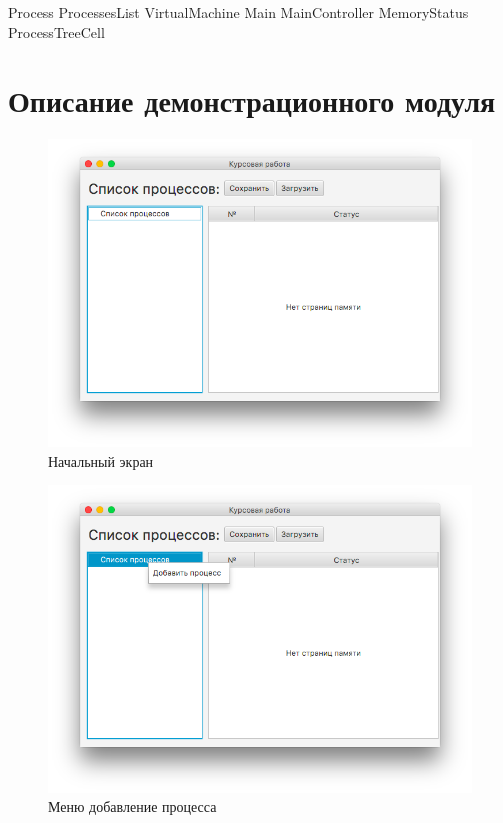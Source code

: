 \documentclass[russian,utf8,simple,hpadding=10mm,vpadding=20mm]{eskdtext}
\begin{document}
Process
ProcessesList
VirtualMachine
Main
MainController
MemoryStatus
ProcessTreeCell

\newpage
\parindent=15mm
\section{Описание демонстрационного модуля}

\begin{figure}[!hb]
    \centering
    \includegraphics[width=1\textwidth]{screenshots/1.png}
    \caption{Начальный экран}
    \label{fig:mesh1}
\end{figure}
\begin{figure}[!h]
    \centering
    \includegraphics[width=1\textwidth]{screenshots/2.png}
    \caption{Меню добавление процесса}
    \label{fig:mesh2}
\end{figure}
\end{document}

